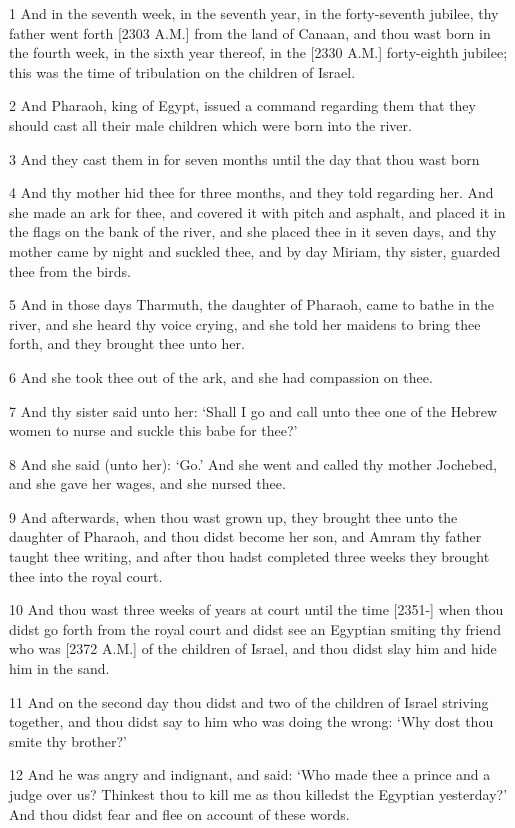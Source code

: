 \par 1 And in the seventh week, in the seventh year, in the forty-seventh jubilee, thy father went forth [2303 A.M.] from the land of Canaan, and thou wast born in the fourth week, in the sixth year thereof, in the [2330 A.M.] forty-eighth jubilee; this was the time of tribulation on the children of Israel.
\par 2 And Pharaoh, king of Egypt, issued a command regarding them that they should cast all their male children which were born into the river.
\par 3 And they cast them in for seven months until the day that thou wast born
\par 4 And thy mother hid thee for three months, and they told regarding her. And she made an ark for thee, and covered it with pitch and asphalt, and placed it in the flags on the bank of the river, and she placed thee in it seven days, and thy mother came by night and suckled thee, and by day Miriam, thy sister, guarded thee from the birds.
\par 5 And in those days Tharmuth, the daughter of Pharaoh, came to bathe in the river, and she heard thy voice crying, and she told her maidens to bring thee forth, and they brought thee unto her.
\par 6 And she took thee out of the ark, and she had compassion on thee.
\par 7 And thy sister said unto her: ‘Shall I go and call unto thee one of the Hebrew women to nurse and suckle this babe for thee?’
\par 8 And she said (unto her): ‘Go.’ And she went and called thy mother Jochebed, and she gave her wages, and she nursed thee.
\par 9 And afterwards, when thou wast grown up, they brought thee unto the daughter of Pharaoh, and thou didst become her son, and Amram thy father taught thee writing, and after thou hadst completed three weeks they brought thee into the royal court.
\par 10 And thou wast three weeks of years at court until the time [2351-] when thou didst go forth from the royal court and didst see an Egyptian smiting thy friend who was [2372 A.M.] of the children of Israel, and thou didst slay him and hide him in the sand.
\par 11 And on the second day thou didst and two of the children of Israel striving together, and thou didst say to him who was doing the wrong: ‘Why dost thou smite thy brother?’
\par 12 And he was angry and indignant, and said: ‘Who made thee a prince and a judge over us? Thinkest thou to kill me as thou killedst the Egyptian yesterday?’ And thou didst fear and flee on account of these words.

